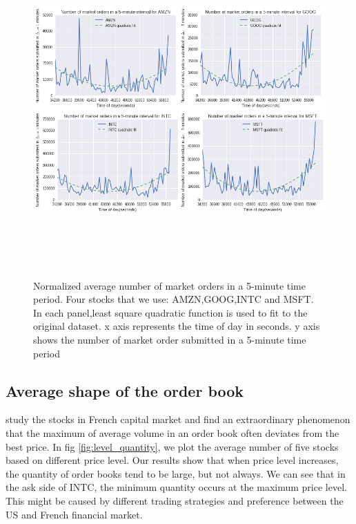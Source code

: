 \begin{figure}[hbtp]
	\begin{center}
		\includegraphics[width=6in,height=5in]{figures/market_vol_time.png}
	\end{center}
	\caption{Normalized average number of market orders in a 5-minute time period. Four stocks that we use: AMZN,GOOG,INTC and MSFT. In each panel,least square quadratic function is used to fit to the original dataset. x axis represents the time of day in seconds. y axis shows the number of market order submitted in a 5-minute time period} \label{fig:market_vol_time}
\end{figure}

\subsection{Average shape of the order book}

\cite{bouchaud2002statistical} study the stocks in French capital market and find an extraordinary phenomenon that the maximum of average volume in an order book often deviates from the best price. In fig \ref {fig:level_quantity}, we plot the average number of five stocks based on different price level. Our results show that when price level increases, the quantity of order books tend to be large, but not always. We can see that in the ask side of INTC, the minimum quantity occurs at the maximum price level. This might be caused by different trading strategies and preference between the US and French financial market.   

